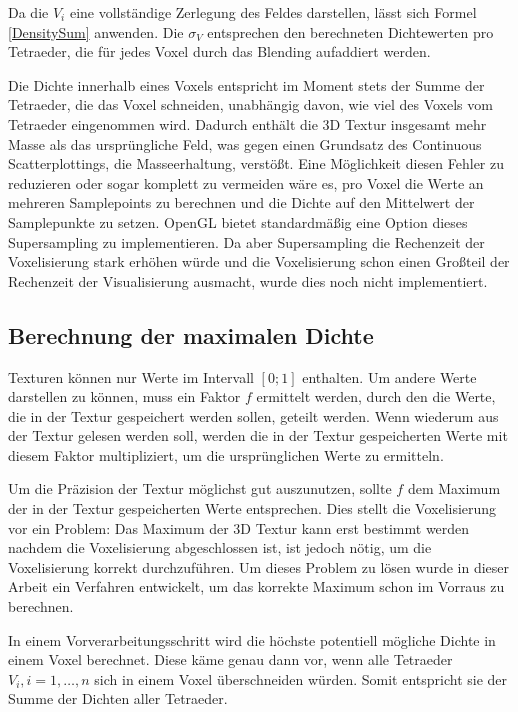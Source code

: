 \documentclass[a4paper,fontsize=12pt,toc=bib,halfparskip]{scrartcl}
\begin{document}
Da die $V_i$ eine vollst\"andige Zerlegung des Feldes darstellen, l\"asst sich Formel \ref{DensitySum} anwenden. Die $\sigma_V$ entsprechen den berechneten Dichtewerten pro Tetraeder, die f\"ur jedes Voxel durch das Blending aufaddiert werden.

Die Dichte innerhalb eines Voxels entspricht im Moment stets der Summe der Tetraeder, die das Voxel schneiden, unabh\"angig davon, wie viel des Voxels vom Tetraeder eingenommen wird. Dadurch enth\"alt die 3D Textur insgesamt mehr Masse als das urspr\"ungliche Feld, was gegen einen Grundsatz des Continuous Scatterplottings, die Masseerhaltung, verst\"o{\ss}t. Eine M\"oglichkeit diesen Fehler zu reduzieren oder sogar komplett zu vermeiden w\"are es, pro Voxel die Werte an mehreren Samplepoints zu berechnen und die Dichte auf den Mittelwert der Samplepunkte zu setzen. OpenGL bietet standardm\"a{\ss}ig eine Option dieses Supersampling zu implementieren. Da aber Supersampling die Rechenzeit der Voxelisierung stark erh\"ohen w\"urde und die Voxelisierung schon einen Gro{\ss}teil der Rechenzeit der Visualisierung ausmacht, wurde dies noch nicht implementiert.

\subsection{Berechnung der maximalen Dichte}
Texturen k\"onnen nur Werte im Intervall $[0;1]$ enthalten. Um andere Werte darstellen zu k\"onnen, muss ein Faktor $f$ ermittelt werden, durch den die Werte, die in der Textur gespeichert werden sollen, geteilt werden. Wenn wiederum aus der Textur gelesen werden soll, werden die in der Textur gespeicherten Werte mit diesem Faktor multipliziert, um die urspr\"unglichen Werte zu ermitteln.

Um die Pr\"azision der Textur m\"oglichst gut auszunutzen, sollte $f$ dem Maximum der in der Textur gespeicherten Werte entsprechen. Dies stellt die Voxelisierung vor ein Problem: Das Maximum der 3D Textur kann erst bestimmt werden nachdem die Voxelisierung abgeschlossen ist, ist jedoch n\"otig, um die Voxelisierung korrekt durchzuf\"uhren. Um dieses Problem zu l\"osen wurde in dieser Arbeit ein Verfahren entwickelt, um das korrekte Maximum schon im Vorraus zu berechnen.

In einem Vorverarbeitungsschritt wird die h\"ochste potentiell m\"ogliche Dichte in einem Voxel berechnet. Diese k\"ame genau dann vor, wenn alle Tetraeder $V_i, i=1,\dots,n$ sich in einem Voxel \"uberschneiden w\"urden. Somit entspricht sie der Summe der Dichten aller Tetraeder. 
\end{document}
